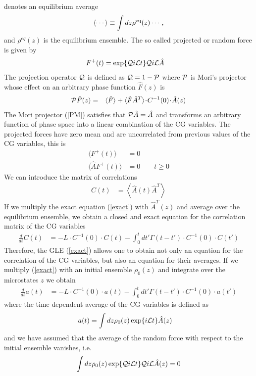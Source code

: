 \documentclass[a4paper,openright,12pt]{book}
\newcommand{\esc}{\!\cdot\!}
\newcommand{\llangle}{\left\langle}
\newcommand{\rrangle}{\right\rangle}
\begin{document}
denotes an equilibrium average
\begin{equation}
\langle\cdots\rangle\equiv \int dz\rho^{\rm eq}(z)\cdots,
\label{esc}
\end{equation}
and  $\rho^{eq}(z)$ is  the  equilibrium  ensemble.
The so called projected or random force is given by
\begin{align}
F^+(t)&= \exp\{{\cal Q}i{\cal L}t\} {\cal Q}i{\cal L}\hat{A}  
\label{Proj}
\end{align}
The projection operator ${\cal Q}$ is defined as ${\cal Q}=1-{\cal P}$
where  ${\cal P}$  is Mori's  projector whose  effect on  an arbitrary
phase function $\hat{F}(z)$ is
\begin{eqnarray}
  {\cal P}\hat{F}(z) &=& \langle \hat{F}\rangle+ \langle \hat{F}\hat{A}^T \rangle\esc  C^{-1}(0)\esc  \hat{A}(z)
\label{PM}
\end{eqnarray}
The  Mori  projector  (\ref{PM})   satisfies  that  ${\cal  P}\hat{A}=
\hat{A}$ and  transforms an arbitrary  function of phase space  into a
linear combination  of the  CG variables.   The projected  forces have
zero  mean  and  are  uncorrelated  from
previous values of the CG variables, this is 
\begin{align}
\langle  F^+  (t)\rangle&=0  
\nonumber\\
\langle \hat{A} F^+ (t)\rangle&=0 \quad\quad t\ge 0
\end{align}
We can introduce the matrix of correlations 
\begin{align}
  C(t)&=  \llangle \hat{A}(t)\hat{A}^T\rrangle
\end{align}
If we multiply the  exact equation (\ref{exact})  with $\hat{A}^T(z)$
and  average over  the equilibrium  ensemble, we  obtain a  closed and
exact equation for the correlation matrix of the CG variables
\begin{align}
  \frac{d}{dt}C(t)&=-L\esc C^{-1}(0)\esc C(t)
-\int_0^tdt' \Gamma(t-t')\esc C^{-1}(0)\esc  C(t')
\label{exactC}
\end{align}
Therefore, the GLE (\ref{exact}) allows  one to obtain not only an equation for the correlation of the CG variables, but also an equation for  their averages. 
If we multiply  (\ref{exact}) with an initial ensemble $\rho_0(z)$ and integrate over the microstates $z$ we obtain
\begin{align}
  \frac{d}{dt}a(t) &= -L\esc C^{-1}(0)\esc a(t)
  -\int_0^tdt' \Gamma(t-t')\esc  C^{-1}(0)\esc a(t')
\label{exactAve}
\end{align}
where the time-dependent average of the CG variables is defined as
\begin{align}
  a(t)&=\int dz \rho_0(z) \exp\{i{\cal L}t\}\hat{A}(z)
\end{align}
and we have assumed that the average of the random force with respect
to the initial ensemble vanishes, i.e.
\begin{align}
\int dz\rho_0(z)\exp\{{\cal Q}i{\cal L}t\} {\cal Q}i{\cal L}\hat{A}(z)=0
\label{F0}
\end{align}
\end{document}
